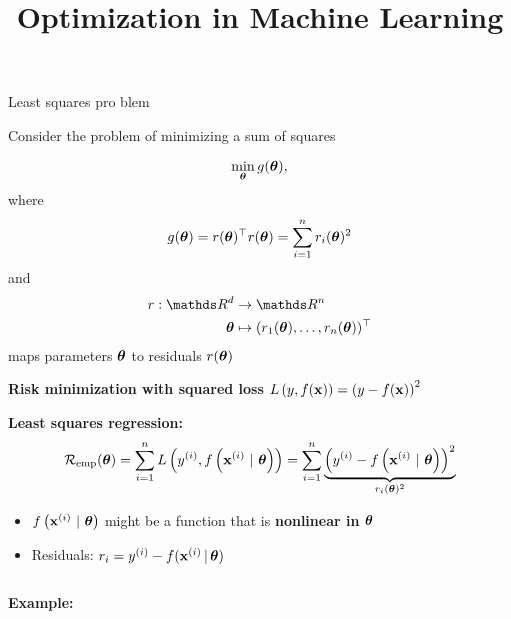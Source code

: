 \documentclass[11pt,compress,t,notes=noshow, xcolor=table]{beamer}
\title{Optimization in Machine Learning}
\begin{document}
 


\begin{vbframe}{Least squares pro blem}

Consider the problem of minimizing a sum of squares

\begin{equation*}
	\min_{\bm{\theta}} g(\bm{\theta}),
\end{equation*}
where
\begin{equation*}
    g(\bm{\theta}) = r(\bm{\theta})^\top r(\bm{\theta}) = \sum_{i = 1}^n r_i(\bm{\theta})^2
\end{equation*}
and
\begin{align*}
	r: \R^d &\to \R^n \\
	\thetav &\mapsto (r_1(\thetav), \ldots, r_n(\thetav))^\top
\end{align*}
maps parameters $\bm{\theta}$ to residuals $r(\bm{\theta})$

\framebreak 

\textbf{Risk minimization with squared loss} $L\left(y, f(\mathbf{x})\right) = \left(y - f(\mathbf{x})\right)^2$

\medskip

\textbf{Least squares regression:}
\begin{equation*}
    \mathcal{R}_{\text{emp}}(\bm{\theta}) = \sum\limits_{i=1}^n L\left(y^{(i)}, f\left(\mathbf{x}^{(i)} ~|~ \bm{\theta}\right)\right) = \sum\limits_{i=1}^n \underbrace{\left(y^{(i)} - f\left(\mathbf{x}^{(i)} ~|~ \bm{\theta}\right) \right)^2}_{r_i(\bm{\theta})^2}
\end{equation*}

\begin{itemize}
    \item $f\left(\mathbf{x}^{(i)} ~|~ \bm{\theta}\right)$ might be a function that is \textbf{nonlinear in $\bm{\theta}$}
    \item Residuals: $r_i = y^{(i)} - f(\mathbf{x}^{(i)} \,|\, \bm{\theta})$
\end{itemize}

\vspace*{0.3cm} 

\begin{columns}
\begin{column}{0.55\textwidth}
\textbf{Example:} 


\end{column}
\end{columns}
\end{vbframe}
\end{document}
